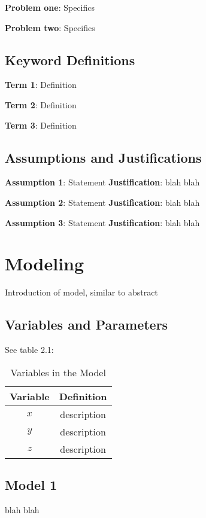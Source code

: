 \documentclass{mcmthesis}
\begin{document}
    \noindent\textbf{Problem one}: Specifics

    \noindent\textbf{Problem two}: Specifics

    \subsection{Keyword Definitions}
    \noindent\textbf{Term 1}: Definition

    \noindent\textbf{Term 2}: Definition

    \noindent\textbf{Term 3}: Definition

    \subsection{Assumptions and Justifications}
    \noindent\textbf{Assumption 1}: Statement
    \textbf{Justification}: blah blah

    \noindent\textbf{Assumption 2}: Statement
    \textbf{Justification}: blah blah

    \noindent\textbf{Assumption 3}: Statement
    \textbf{Justification}: blah blah


    \section{Modeling}
    Introduction of model, similar to abstract

    \subsection{Variables and Parameters}
    See table 2.1:
    \begin{table}[h!]
        \centering
        \begin{tabular}{cc}
            \toprule
            Variable & Definition      \\
            \midrule
            $x$      & description     \\
            $y$      & description     \\
            $z$      & description     \\
            \bottomrule
        \end{tabular}
        \caption{Variables in the Model}
        \label{tab:my_label}
    \end{table}

    \subsection{Model 1}
    blah blah
\end{document}
